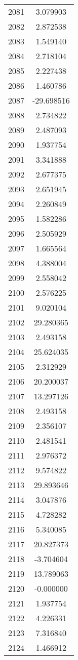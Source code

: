 \documentclass[12pt]{article}
\begin{document}
\begin{longtable}{@{}cc@{}}
2081 & 3.079903 \\
2082 & 2.872538 \\
2083 & 1.549140 \\
2084 & 2.718104 \\
2085 & 2.227438 \\
2086 & 1.460786 \\
2087 & -29.698516 \\
2088 & 2.734822 \\
2089 & 2.487093 \\
2090 & 1.937754 \\
2091 & 3.341888 \\
2092 & 2.677375 \\
2093 & 2.651945 \\
2094 & 2.260849 \\
2095 & 1.582286 \\
2096 & 2.505929 \\
2097 & 1.665564 \\
2098 & 4.388004 \\
2099 & 2.558042 \\
2100 & 2.576225 \\
2101 & 9.020104 \\
2102 & 29.280365 \\
2103 & 2.493158 \\
2104 & 25.624035 \\
2105 & 2.312929 \\
2106 & 20.200037 \\
2107 & 13.297126 \\
2108 & 2.493158 \\
2109 & 2.356107 \\
2110 & 2.481541 \\
2111 & 2.976372 \\
2112 & 9.574822 \\
2113 & 29.893646 \\
2114 & 3.047876 \\
2115 & 4.728282 \\
2116 & 5.340085 \\
2117 & 20.827373 \\
2118 & -3.704604 \\
2119 & 13.789063 \\
2120 & -0.000000 \\
2121 & 1.937754 \\
2122 & 4.226331 \\
2123 & 7.316840 \\
2124 & 1.466912 \\

\end{longtable}
\end{document}
